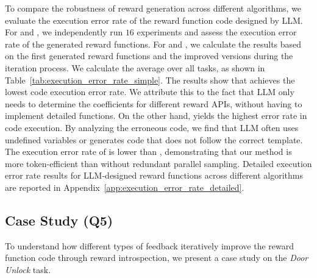 \documentclass{article}
\theoremstyle{plain}
\theoremstyle{definition}
\theoremstyle{remark}
\begin{document}
To compare the robustness of reward generation across different algorithms, we evaluate the execution error rate of the reward function code designed by LLM. For \lr and \tr, we independently run $16$ experiments and assess the execution error rate of the generated reward functions. For \eureka and \ourmethod, we calculate the results based on the first generated reward functions and the improved versions during the iteration process. We calculate the average over all tasks, as shown in Table~\ref{tab:execution_error_rate_simple}. The results show that \lr achieves the lowest code execution error rate. We attribute this to the fact that LLM only needs to determine the coefficients for different reward APIs, without having to implement detailed functions. On the other hand, \tr yields the highest error rate in code execution. By analyzing the erroneous code, we find that LLM often uses undefined variables or generates code that does not follow the correct template. The execution error rate of \ourmethod is lower than \eureka, demonstrating that our method is more token-efficient than \eureka without redundant parallel sampling. Detailed execution error rate results for LLM-designed reward functions across different algorithms are reported in Appendix~\ref{app:execution_error_rate_detailed}.


\begin{table}[!ht]
\centering
\caption{Comparison of execution error rate among different methods averaged across all evaluation tasks.}
\label{tab:execution_error_rate_simple}
\end{table}

\subsection{Case Study (Q5)}\label{sec:case_study}

To understand how different types of feedback iteratively improve the reward function code through reward introspection, we present a case study on the \textit{Door Unlock} task.
\end{document}
